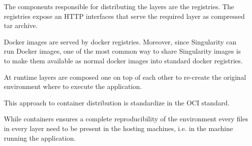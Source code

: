 The components responsible for distributing the layers are the registries. The
registries expose an HTTP interfaces that serve the required layer as
compressed tar archive.

Docker images are served by docker registries. Moreover, since Singularity can
run Docker images, one of the most common way to share Singularity images is to
make them available as normal docker images into standard docker registries. 

At runtime layers are composed one on top of each other to re-create the
original environment where to execute the application.

This approach to container distribution is standardize in the OCI standard.

While containers ensures a complete reproducibility of the environment every
files in every layer need to be present in the hosting machines, i.e. in the
machine running the application.


